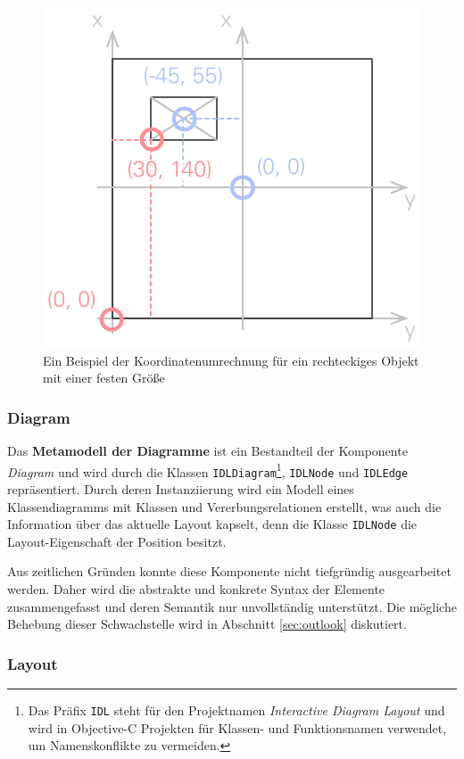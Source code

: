 \begin{figure}[hbt]
    \centering
    \includegraphics{assets/coordinates-conversion}
    \caption{Ein Beispiel der Koordinatenumrechnung für ein rechteckiges Objekt mit einer festen Größe}
    \label{fig:coordinates-conversion}
\end{figure}

\subsubsection{Diagram}
\label{subsubsec:component-diagram}

Das \textbf{Metamodell der Diagramme} ist ein Bestandteil der Komponente \textit{Diagram} und wird durch die Klassen \texttt{IDLDiagram}\footnote{Das Präfix \texttt{IDL} steht für den Projektnamen \textit{Interactive Diagram Layout} und wird in Objective-C Projekten für Klassen- und Funktionsnamen verwendet, um Namenskonflikte zu vermeiden.}, \texttt{IDLNode} und \texttt{IDLEdge} repräsentiert. Durch deren Instanziierung wird ein Modell eines Klassendiagramms mit Klassen und Vererbungsrelationen erstellt, was auch die Information über das aktuelle Layout kapselt, denn die Klasse \texttt{IDLNode} die Layout-Eigenschaft der Position besitzt.

Aus zeitlichen Gründen konnte diese Komponente nicht tiefgründig ausgearbeitet werden. Daher wird die abstrakte und konkrete Syntax der Elemente zusammengefasst und deren Semantik nur unvollständig unterstützt. Die mögliche Behebung dieser Schwachstelle wird in Abschnitt \ref{sec:outlook} diskutiert.

\subsubsection{Layout}

